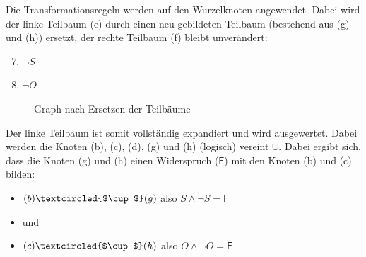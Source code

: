 Die Transformationsregeln werden auf den Wurzelknoten angewendet. Dabei wird der linke Teilbaum (e) durch einen neu gebildeten Teilbaum (bestehend aus (g) und (h)) ersetzt, der rechte Teilbaum (f) bleibt unverändert:
\begin{enumerate}[label= (\alph*)]
    \setcounter{enumi}{6}
    \item $\neg S$
    \item $\neg O$
\end{enumerate}

\begin{figure}[htbp]
    \centering
    \caption{Graph nach Ersetzen der Teilbäume}
\end{figure}

Der linke Teilbaum ist somit vollständig expandiert und wird ausgewertet. Dabei werden die Knoten (b), (c), (d), (g) und (h) (logisch) vereint \textcircled{$\cup$}. Dabei ergibt sich,  dass die Knoten (g) und (h) einen Widerspruch ($\mathsf{F}$) mit den Knoten (b) und (c) bilden:
\begin{itemize}
    \item $(b) \textcircled{$\cup$} (g)$ also $S \wedge \neg S = \mathsf{F}$
    \item[] und
    \item $(c) \textcircled{$\cup$} (h)$ also $O \wedge \neg O = \mathsf{F}$
\end{itemize}

